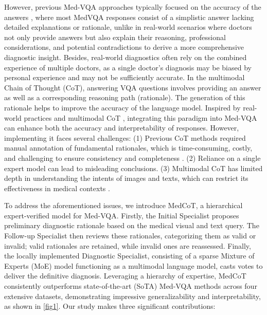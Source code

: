 \documentclass[11pt]{article}
\begin{document}
However, previous Med-VQA approaches typically focused on the accuracy of the answers \cite{nguyen2019overcoming,liu2023parameter,zhan2020medical}
, where most MedVQA responses consist of a simplistic answer lacking detailed explanations or rationale, unlike in real-world scenarios where doctors not only provide answers but also explain their reasoning, professional considerations, and potential contradictions to derive a more comprehensive diagnostic insight. 
Besides, real-world diagnostics often rely on the combined experience of multiple doctors, as a single doctor's diagnosis may be biased by personal experience and may not be sufficiently accurate.
In the multimodal Chain of Thought (CoT), answering VQA questions involves providing an answer as well as a corresponding reasoning path (rationale). 
The generation of this rationale helps to improve the accuracy of the language model.
Inspired by real-world practices and multimodal CoT \citet{zhang2023multimodal,zheng2023ddcot}, integrating this paradigm into Med-VQA can enhance both the accuracy and interpretability of responses. However, implementing it faces several challenges: (1) Previous CoT methods required manual annotation of fundamental rationales, which is time-consuming, costly, and challenging to ensure consistency and completeness \cite{zhang2023multimodal,zheng2023ddcot}. (2) Reliance on a single expert model can lead to misleading conclusions. (3) Multimodal CoT has limited depth in understanding the intents of images and texts, which can restrict its effectiveness in medical contexts \cite{zhang2023multimodal}.

To address the aforementioned issues, we introduce MedCoT, a hierarchical expert-verified model for Med-VQA. Firstly, the Initial Specialist proposes preliminary diagnostic rationale based on the medical visual and text query. The Follow-up Specialist then reviews these rationales, categorizing them as valid or invalid; valid rationales are retained, while invalid ones are reassessed. 
Finally, the locally implemented Diagnostic Specialist, consisting of a sparse Mixture of Experts (MoE) model functioning as a multimodal language model, casts votes to deliver the definitive diagnosis.
Leveraging a hierarchy of expertise, MedCoT consistently outperforms state-of-the-art (SoTA) Med-VQA methods across four extensive datasets, demonstrating impressive generalizability and interpretability, as shown in \autoref{fig1}.
Our study makes three significant contributions:
\end{document}

